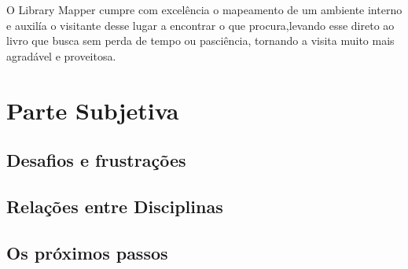 \documentclass[a4paper,10pt]{article}
\begin{document}
	O Library Mapper cumpre com excelência o mapeamento de um ambiente interno e auxilía  o visitante desse lugar a encontrar o que 
	procura,levando esse direto ao livro que busca sem perda de tempo ou pasciência, tornando a visita muito mais agradável e proveitosa.
	
   
  \section{Parte Subjetiva}
  \subsection{Desafios e frustrações}
  \subsection{Relações entre Disciplinas}
  \subsection{Os próximos passos}
  
   
  
\end{document}
